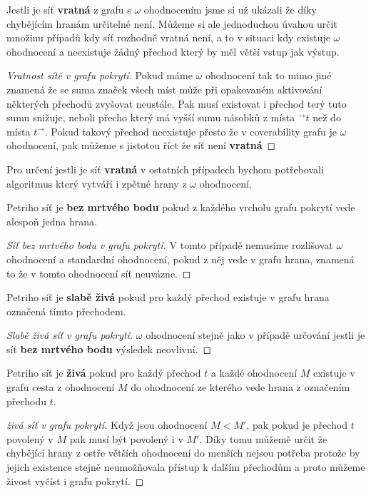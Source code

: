 \documentclass[
  biblatex,
  glossaries,
  index
]{kidiplom}
\begin{document}
Jestli je síť \textbf{vratná} z grafu s $\omega$ ohodnocením jsme si už ukázali 
že díky chybějícím hranám určitelné není. Můžeme si ale jednoduchou 
úvahou určit množinu případů kdy síť rozhodně vratná není, a to v 
situaci kdy existuje $\omega$ ohodnocení a neexistuje žádný přechod 
který by měl větší vstup jak výstup.
\begin{proof}[Vratnost sítě v grafu pokrytí]
  Pokud máme $\omega$ ohodnocení tak to mimo jiné znamená že se suma značek všech 
  míst může při opakovaném aktivování
  některých přechodů zvyšovat neustále. Pak musí existovat i přechod
  terý tuto sumu snižuje, neboli přecho který má vyšší sumu
  násobků z místa $^\to t$ než do místa $t ^\to$. Pokud takový 
  přechod neexistuje přesto že v coverability grafu je $\omega$ ohodnocení,
  pak můžeme s jistotou říct že síť není \textbf{vratná}
\end{proof}
Pro určení jestli je síť \textbf{vratná} v ostatních případech
bychom potřebovali algoritmus který vytváří i zpětné hrany z $\omega$ ohodnocení.


Petriho síť je \textbf{bez mrtvého bodu} pokud z každého vrcholu grafu 
pokrytí vede alespoň jedna hrana.
\begin{proof}[Síť bez mrtvého bodu v grafu pokrytí]
  V tomto případě nemusíme rozlišovat $\omega$ ohodnocení a standardní ohodnocení,
  pokud z něj vede v grafu hrana, znamená to že v tomto ohodnocení síť neuvázne.
\end{proof}

Petriho síť je \textbf{slabě živá} pokud pro každý přechod existuje 
v grafu hrana označená tímto přechodem.
\begin{proof}[Slabě živá síť v grafu pokrytí]
  $\omega$ ohodnocení stejně jako v případě 
  určování jestli je síť \textbf{bez mrtvého bodu} 
  výsledek neovlivní.
\end{proof}

Petriho síť je \textbf{živá} pokud 
pro každý přechod $t$ a každé ohodnocení $M$ existuje v grafu cesta
z ohodnocení $M$ do ohodnocení ze kterého vede hrana z označením přechodu $t$.
\begin{proof}[živá síť v grafu pokrytí]
 Když jsou ohodnocení $M < M'$, pak pokud je přechod $t$ 
  povolený v $M$ pak musí být povolený i v $M'$. Díky tomu můžemě určit
  že chybějící hrany z ostře větších ohodnocení do menších nejsou potřeba protože 
  by jejich existence stejně neumožňovala přístup k dalším přechodům a proto můžeme 
  živost vyčíst i grafu pokrytí.
\end{proof}
\end{document}

